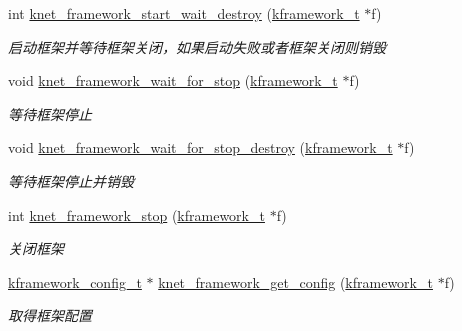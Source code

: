 \begin{DoxyCompactItemize}
int \hyperlink{a00114_gab44f183a42eda626fe6ec1e6d35bb859_gab44f183a42eda626fe6ec1e6d35bb859}{knet\+\_\+framework\+\_\+start\+\_\+wait\+\_\+destroy} (\hyperlink{a00056_a3195a3be35782fc1efb920c811be111d_a3195a3be35782fc1efb920c811be111d}{kframework\+\_\+t} $\ast$f)
\begin{DoxyCompactList}\small\item\em 启动框架并等待框架关闭，如果启动失败或者框架关闭则销毁 \end{DoxyCompactList}\item 
void \hyperlink{a00114_gacff434cca9ce60fa5a3597348ee4360b_gacff434cca9ce60fa5a3597348ee4360b}{knet\+\_\+framework\+\_\+wait\+\_\+for\+\_\+stop} (\hyperlink{a00056_a3195a3be35782fc1efb920c811be111d_a3195a3be35782fc1efb920c811be111d}{kframework\+\_\+t} $\ast$f)
\begin{DoxyCompactList}\small\item\em 等待框架停止 \end{DoxyCompactList}\item 
void \hyperlink{a00114_ga5936d2ece03511c366b19bc7616ac8be_ga5936d2ece03511c366b19bc7616ac8be}{knet\+\_\+framework\+\_\+wait\+\_\+for\+\_\+stop\+\_\+destroy} (\hyperlink{a00056_a3195a3be35782fc1efb920c811be111d_a3195a3be35782fc1efb920c811be111d}{kframework\+\_\+t} $\ast$f)
\begin{DoxyCompactList}\small\item\em 等待框架停止并销毁 \end{DoxyCompactList}\item 
int \hyperlink{a00114_gac8f76fe72392bc5103b70fb5b3280839_gac8f76fe72392bc5103b70fb5b3280839}{knet\+\_\+framework\+\_\+stop} (\hyperlink{a00056_a3195a3be35782fc1efb920c811be111d_a3195a3be35782fc1efb920c811be111d}{kframework\+\_\+t} $\ast$f)
\begin{DoxyCompactList}\small\item\em 关闭框架 \end{DoxyCompactList}\item 
\hyperlink{a00056_adeaf952e0f0887507ff836385bf54874_adeaf952e0f0887507ff836385bf54874}{kframework\+\_\+config\+\_\+t} $\ast$ \hyperlink{a00114_ga2fcd8c172557a78fe7edbba0e7f9da40_ga2fcd8c172557a78fe7edbba0e7f9da40}{knet\+\_\+framework\+\_\+get\+\_\+config} (\hyperlink{a00056_a3195a3be35782fc1efb920c811be111d_a3195a3be35782fc1efb920c811be111d}{kframework\+\_\+t} $\ast$f)
\begin{DoxyCompactList}\small\item\em 取得框架配置 \end{DoxyCompactList}\item 

\end{DoxyCompactItemize}
